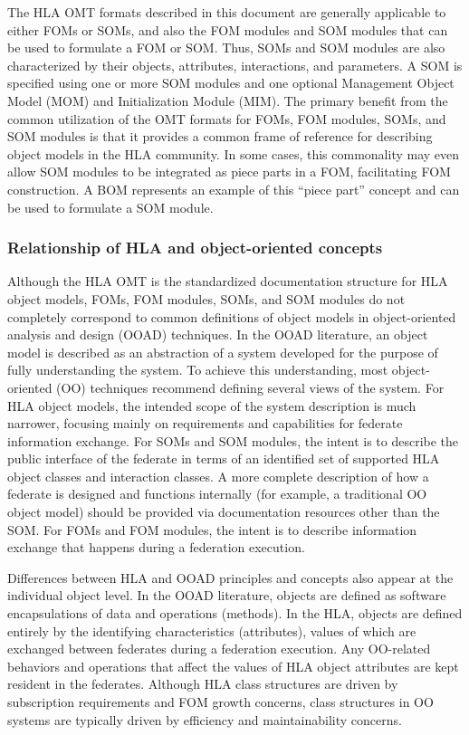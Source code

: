 The HLA OMT formats described in this document are generally applicable to either FOMs or SOMs, and also the FOM modules and SOM modules that can be used to formulate a FOM or SOM. Thus, SOMs and SOM modules are also characterized by their objects, attributes, interactions, and parameters. A SOM is specified using one or more SOM modules and one optional Management Object Model (MOM) and Initialization Module (MIM). The primary benefit from the common utilization of the OMT formats for FOMs, FOM modules, SOMs, and SOM modules is that it provides a common frame of reference for describing object models in the HLA community. In some cases, this commonality may even allow SOM modules to be integrated as piece parts in a FOM, facilitating FOM construction. A BOM represents an example of this ``piece part'' concept and can be used to formulate a SOM module.

\newpage

\subsubsection{Relationship of HLA and object-oriented concepts}
Although the HLA OMT is the standardized documentation structure for HLA object models, FOMs, FOM modules, SOMs, and SOM modules do not completely correspond to common definitions of object models in object-oriented analysis and design (OOAD) techniques. In the OOAD literature, an object model is described as an abstraction of a system developed for the purpose of fully understanding the system. To achieve this understanding, most object-oriented (OO) techniques recommend defining several views of the system. For HLA object models, the intended scope of the system description is much narrower, focusing mainly on requirements and capabilities for federate information exchange. For SOMs and SOM modules, the intent is to describe the public interface of the federate in terms of an identified set of supported HLA object classes and interaction classes. A more complete description of how a federate is designed and functions internally (for example, a traditional OO object model) should be provided via documentation resources other than the SOM. For FOMs and FOM modules, the intent is to describe information exchange that happens during a federation execution.

Differences between HLA and OOAD principles and concepts also appear at the individual object level. In the OOAD literature, objects are defined as software encapsulations of data and operations (methods). In the HLA, objects are defined entirely by the identifying characteristics (attributes), values of which are exchanged between federates during a federation execution. Any OO-related behaviors and operations that affect the values of HLA object attributes are kept resident in the federates. Although HLA class structures are driven by subscription requirements and FOM growth concerns, class structures in OO systems are typically driven by efficiency and maintainability concerns.


